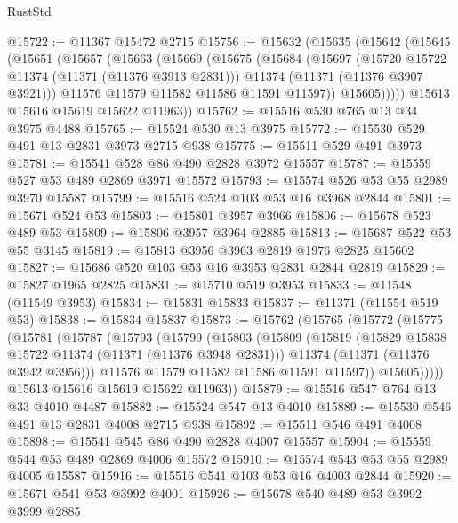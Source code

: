 \begin{lexlean}{RustStd}
\begin{coremodule}
{\begin{coremodule}
{{{{{{{{{{{{{{{{{{{{{{{{{{{{{{{{{@15722 := @11367 @15472 @2715
@15756 := @15632
    (@15635
      (@15642
        (@15645
          (@15651
            (@15657
              (@15663
                (@15669
                  (@15675
                    (@15684
                      (@15697
                        (@15720 @15722 @11374 (@11371 (@11376 @3913 @2831)))
                        @11374
                        (@11371 (@11376 @3907 @3921)))
                      @11576
                      @11579
                      @11582
                      @11586
                      @11591
                      @11597))
                  @15605)))))
        @15613
        @15616
        @15619
        @15622
        @11963))
@15762 := @15516 @530 @765 @13 @34 @3975 @4488
@15765 := @15524 @530 @13 @3975
@15772 := @15530 @529 @491 @13 @2831 @3973 @2715 @938
@15775 := @15511 @529 @491 @3973
@15781 := @15541 @528 @86 @490 @2828 @3972 @15557
@15787 := @15559 @527 @53 @489 @2869 @3971 @15572
@15793 := @15574 @526 @53 @55 @2989 @3970 @15587
@15799 := @15516 @524 @103 @53 @16 @3968 @2844
@15801 := @15671 @524 @53
@15803 := @15801 @3957 @3966
@15806 := @15678 @523 @489 @53
@15809 := @15806 @3957 @3964 @2885
@15813 := @15687 @522 @53 @55 @3145
@15819 := @15813 @3956 @3963 @2819 @1976 @2825 @15602
@15827 := @15686 @520 @103 @53 @16 @3953 @2831 @2844 @2819
@15829 := @15827 @1965 @2825
@15831 := @15710 @519 @3953
@15833 := @11548 (@11549 @3953)
@15834 := @15831 @15833
@15837 := @11371 (@11554 @519 @53)
@15838 := @15834 @15837
@15873 := @15762
    (@15765
      (@15772
        (@15775
          (@15781
            (@15787
              (@15793
                (@15799
                  (@15803
                    (@15809
                      (@15819
                        (@15829 @15838 @15722 @11374 (@11371 (@11376 @3948 @2831)))
                        @11374
                        (@11371 (@11376 @3942 @3956)))
                      @11576
                      @11579
                      @11582
                      @11586
                      @11591
                      @11597))
                  @15605)))))
        @15613
        @15616
        @15619
        @15622
        @11963))
@15879 := @15516 @547 @764 @13 @33 @4010 @4487
@15882 := @15524 @547 @13 @4010
@15889 := @15530 @546 @491 @13 @2831 @4008 @2715 @938
@15892 := @15511 @546 @491 @4008
@15898 := @15541 @545 @86 @490 @2828 @4007 @15557
@15904 := @15559 @544 @53 @489 @2869 @4006 @15572
@15910 := @15574 @543 @53 @55 @2989 @4005 @15587
@15916 := @15516 @541 @103 @53 @16 @4003 @2844
@15920 := @15671 @541 @53 @3992 @4001
@15926 := @15678 @540 @489 @53 @3992 @3999 @2885
}}}}}}}}}}}}}}}}}}}}}}}}}}}}}}}}}
\end{coremodule}}
\end{coremodule}
\end{lexlean}
